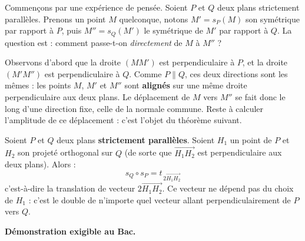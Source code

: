 \documentclass[11pt]{article}
\newcommand{\cle}[1]{{\popxbold\color{popdark}#1}}
\begin{document}
Commençons par une expérience de pensée. Soient $P$ et $Q$ deux plans strictement parallèles. Prenons un point $M$ quelconque, notons $M' = s_P(M)$ son symétrique par rapport à $P$, puis $M'' = s_Q(M')$ le symétrique de $M'$ par rapport à $Q$. La question est : comment passe-t-on \emph{directement} de $M$ à $M''$ ?

Observons d'abord que la droite $(MM')$ est perpendiculaire à $P$, et la droite $(M'M'')$ est perpendiculaire à $Q$. Comme $P \parallel Q$, ces deux directions sont les mêmes : les points $M$, $M'$ et $M''$ sont \textbf{alignés} sur une même droite perpendiculaire aux deux plans. Le déplacement de $M$ vers $M''$ se fait donc le long d'une direction fixe, celle de la normale commune. Reste à calculer l'amplitude de ce déplacement : c'est l'objet du théorème suivant.

\begin{propriete}
Soient $P$ et $Q$ deux plans \textbf{strictement parallèles}. Soient $H_1$ un point de $P$ et $H_2$ son projeté orthogonal sur $Q$ (de sorte que $\overrightarrow{H_1H_2}$ est perpendiculaire aux deux plans). Alors :
\[ s_Q \circ s_P = t_{\,2\overrightarrow{H_1H_2}} \]
c'est-à-dire la \cle{translation} de vecteur $2\overrightarrow{H_1H_2}$. Ce vecteur ne dépend pas du choix de $H_1$ : c'est le double de n'importe quel vecteur allant perpendiculairement de $P$ vers $Q$.
\par\textbf{Démonstration exigible au Bac.}
\end{propriete}
\end{document}

